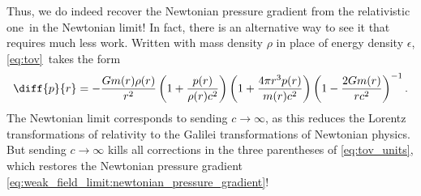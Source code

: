 Thus, we do indeed recover the Newtonian pressure gradient from the relativistic one in the Newtonian limit!
In fact, there is an alternative way to see it that requires much less work.
Written with mass density $\rho$ in place of energy density $\epsilon$, \cref{eq:tov} takes the form
\begin{equation}
	\diff{p}{r} = -\frac{G m(r) \rho(r)}{r^2} \left( 1 + \frac{p(r)}{\rho(r) c^2} \right) \left( 1 + \frac{4 \pi r^3 p(r)}{m(r) c^2} \right) \left( 1 - \frac{2 G m(r)}{r c^2} \right)^{-1} .
	\label{eq:tov_units}
\end{equation}
The Newtonian limit corresponds to sending $c \rightarrow \infty$, as this reduces the Lorentz transformations of relativity to the Galilei transformations of Newtonian physics.
But sending $c \rightarrow \infty$ kills all corrections in the three parentheses of \cref{eq:tov_units}, which restores the Newtonian pressure gradient \eqref{eq:weak_field_limit:newtonian_pressure_gradient}!

